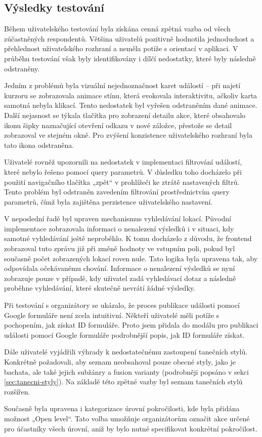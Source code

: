 \subsection{Výsledky testování}
Během uživatelského testování byla získána cenná zpětná vazba od všech zúčastněných respondentů. Většina uživatelů pozitivně hodnotila jednoduchost a přehlednost uživatelského rozhraní a neměla potíže s orientací v aplikaci. V průběhu testování však byly identifikovány i dílčí nedostatky, které byly následně odstraněny.

Jedním z problémů byla vizuální nejednoznačnost karet událostí – při najetí kurzoru se zobrazovala animace stínu, která evokovala interaktivitu, ačkoliv karta samotná nebyla klikací. Tento nedostatek byl vyřešen odstraněním dané animace. Další nejasnost se týkala tlačítka pro zobrazení detailu akce, které obsahovalo ikonu šipky naznačující otevření odkazu v nové záložce, přestože se detail zobrazoval ve stejném okně. Pro zvýšení konzistence uživatelského rozhraní byla tato ikona odstraněna.

Uživatelé rovněž upozornili na nedostatek v implementaci filtrování událostí, které nebylo řešeno pomocí query parametrů. V důsledku toho docházelo při použití navigačního tlačítka „zpět“ v prohlížeči ke ztrátě nastavených filtrů. Tento problém byl odstraněn zavedením filtrování prostřednictvím query parametrů, čímž byla zajištěna perzistence uživatelského nastavení.

V neposlední řadě byl upraven mechanismus vyhledávání lokací. Původní implementace zobrazovala informaci o nenalezení výsledků i v situaci, kdy samotné vyhledávání ještě neproběhlo. K tomu docházelo z důvodu, že frontend zobrazoval tuto zprávu již při změně hodnoty ve vstupním poli, pokud byl současně počet zobrazených lokací roven nule. Tato logika byla upravena tak, aby odpovídala očekávanému chování. Informace o nenalezení výsledků se nyní zobrazuje pouze v případě, kdy uživatel zadá vyhledávací dotaz a následně proběhne vyhledávání, které skutečně nevrátí žádné výsledky.

Při testování s organizátory se ukázalo, že proces publikace události pomocí Google formuláře není zcela intuitivní. Někteří uživatelé měli potíže s pochopením, jak získat ID formuláře. Proto jsem přidala do modálu pro publikaci události pomocí Google formuláře podrobnější popis, jak ID formuláře získat.

Dále uživatelé vyjádřili výhrady k nedostatečnému zastoupení tanečních stylů. Konkrétně požadovali, aby seznam neobsahoval pouze obecné styly, jako je bachata, ale také jejich subžánry a fusion varianty (podrobněji popsáno v sekci \ref{sec:tanecni-styly}). Na základě této zpětné vazby byl seznam tanečních stylů rozšířen.

Současně byla upravena i kategorizace úrovní pokročilosti, kde byla přidána možnost „Open level“. Tato volba umožňuje organizátorům označit akce určené pro účastníky všech úrovní, aniž by bylo nutné specifikovat konkrétní pokročilost.
